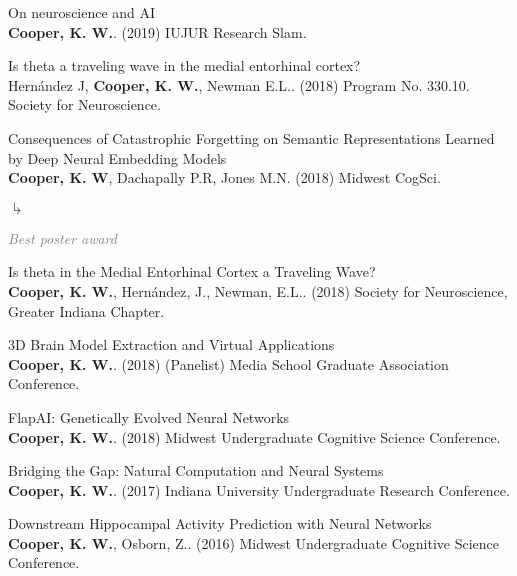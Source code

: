 \documentclass[10pt]{cooperCV2}
\begin{document}
\begin{etaremune}[itemindent=-1.5\bibhang, topsep=0pt,
				   itemsep=\bibsep,partopsep=0pt,parsep=0pt,leftmargin={\bibhang+\widthof{[999]}}]
	
    \item On neuroscience and AI\\ \textbf{Cooper, K. W.}. (2019) IUJUR Research Slam. 
     
	
    \item Is theta a traveling wave in the medial entorhinal cortex?\\ Hernández J, \textbf{Cooper, K. W.}, Newman E.L.. (2018) Program No. 330.10. Society for Neuroscience. 
     
	
    \item Consequences of Catastrophic Forgetting on Semantic Representations Learned by Deep Neural Embedding Models\\ \textbf{Cooper, K. W}, Dachapally P.R, Jones M.N. (2018) Midwest CogSci. 
     
     	\begin{list}{$\drsh$}{}
     	
	     \item  \textcolor{grey}{\textit{Best poster award} }
     	
     	\end{list}
     
	
    \item Is theta in the Medial Entorhinal Cortex a Traveling Wave?\\ \textbf{Cooper, K. W.}, Hernández, J., Newman, E.L.. (2018) Society for Neuroscience, Greater Indiana Chapter. 
     
	
    \item 3D Brain Model Extraction and Virtual Applications\\ \textbf{Cooper, K. W.}. (2018) (Panelist) Media School Graduate Association Conference. 
     
	
    \item FlapAI: Genetically Evolved Neural Networks\\ \textbf{Cooper, K. W.}. (2018) Midwest Undergraduate Cognitive Science Conference. 
     
	
    \item Bridging the Gap: Natural Computation and Neural Systems\\ \textbf{Cooper, K. W.}. (2017) Indiana University Undergraduate Research Conference. 
     
	
    \item Downstream Hippocampal Activity Prediction with Neural Networks\\ \textbf{Cooper, K. W.}, Osborn, Z.. (2016) Midwest Undergraduate Cognitive Science Conference. 
     
	


\end{etaremune}
\end{document}
